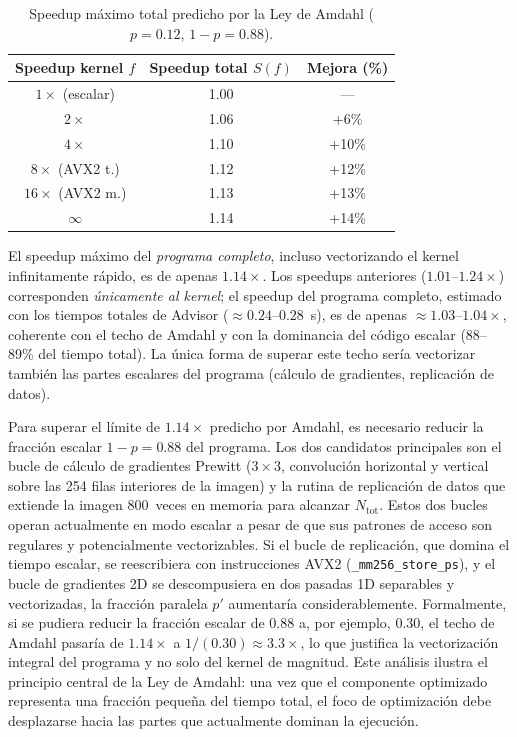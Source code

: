 \begin{table}[htb]
\centering
\caption{Speedup m\'aximo total predicho por la Ley de Amdahl
($p=0.12$, $1-p=0.88$).}
\label{tab:amdahl}
\footnotesize
\begin{tabular}{@{}ccc@{}}
\toprule
\textbf{Speedup kernel} $f$ & \textbf{Speedup total} $S(f)$ &
\textbf{Mejora (\%)} \\
\midrule
$1\times$ (escalar)  & 1.00 &   ---  \\
$2\times$            & 1.06 &  +6\% \\
$4\times$            & 1.10 & +10\% \\
$8\times$  (AVX2 t.) & 1.12 & +12\% \\
$16\times$ (AVX2 m.) & 1.13 & +13\% \\
$\infty$             & 1.14 & +14\% \\
\bottomrule
\end{tabular}
\end{table}

El speedup m\'aximo del \emph{programa completo},
incluso vectorizando el kernel infinitamente r\'apido,
es de apenas $1.14\times$.
Los speedups anteriores ($1.01$--$1.24\times$) corresponden
\emph{\'unicamente al kernel}; el speedup del programa completo,
estimado con los tiempos totales de Advisor
(${\approx}0.24$--$0.28$~s), es de apenas ${\approx}1.03$--$1.04\times$,
coherente con el techo de Amdahl y con la dominancia del c\'odigo
escalar (88--89\% del tiempo total).
La \'unica forma de superar este techo ser\'ia vectorizar
tambi\'en las partes escalares del programa (c\'alculo de
gradientes, replicaci\'on de datos).

Para superar el l\'imite de $1.14\times$ predicho por Amdahl,
es necesario reducir la fracci\'on escalar $1-p = 0.88$ del
programa.
Los dos candidatos principales son el bucle de c\'alculo de
gradientes Prewitt ($3\times3$, convoluci\'on horizontal y
vertical sobre las 254 filas interiores de la imagen) y la
rutina de replicaci\'on de datos que extiende la imagen
800~veces en memoria para alcanzar $N_{\text{tot}}$.
Estos dos bucles operan actualmente en modo escalar a pesar de
que sus patrones de acceso son regulares y potencialmente
vectorizables.
Si el bucle de replicaci\'on, que domina el tiempo escalar,
se reescribiera con instrucciones AVX2 (\texttt{\_mm256\_store\_ps}),
y el bucle de gradientes 2D se descompusiera en dos pasadas 1D
separables y vectorizadas, la fracci\'on paralela $p'$
aumentar\'ia considerablemente.
Formalmente, si se pudiera reducir la fracci\'on escalar de
$0.88$ a, por ejemplo, $0.30$, el techo de Amdahl pasar\'ia
de $1.14\times$ a $1/(0.30) \approx 3.3\times$, lo que
justifica la vectorizaci\'on integral del programa y no solo
del kernel de magnitud.
Este an\'alisis ilustra el principio central de la Ley de Amdahl:
una vez que el componente optimizado representa una fracci\'on
peque\~na del tiempo total, el foco de optimizaci\'on debe
desplazarse hacia las partes que actualmente dominan la ejecuci\'on.

